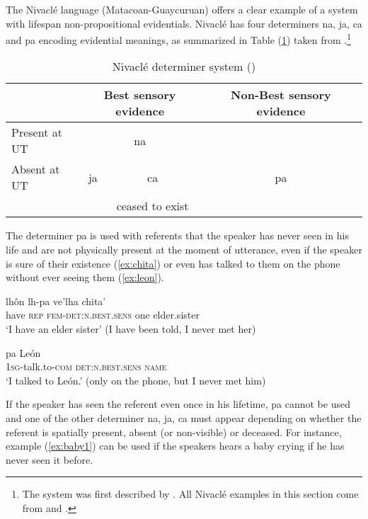 \documentclass[oneside,a4paper,11pt]{article}
\newcommand{\ipa}[1]{{\phon \mbox{#1}}} %
\begin{document}
  The Nivaclé language (Matacoan-Guaycuruan) offers a clear example of a system with lifespan non-propositional evidentials. Nivaclé has four determiners \ipa{na}, \ipa{ja}, \ipa{ca}  and \ipa{pa} encoding evidential meanings, as summarized in Table (\ref{tab:nivakle}) taken from \citet{gutierrez14determiners}.\footnote{The system was first described by \citet[363]{stell89niwakle}. All Nivaclé examples in this section come from \citet{gutierrez11evidentiality} and \citet{gutierrez14determiners}.}  
  
  
\begin{table}[H]
\caption{Nivaclé determiner system (\citealt{gutierrez14determiners}) } \centering \label{tab:nivakle}
\begin{tabular}{l|c|cc|cc}
\toprule
&\multicolumn{2}{c}{Best sensory evidence} &&Non-Best sensory evidence \\
\hline
Present at UT & \multicolumn{2}{c}{\ipa{na}}&& \\
\cline{1-4}
Absent at UT &\ipa{ja} & \ipa{ca}&&\ipa{pa}& \\
&&ceased to exist&\\
\bottomrule
\end{tabular}
\end{table}
   
  The determiner \ipa{pa} is used with referents that the speaker has never seen in his life and are not physically present at the moment of utterance, even if the speaker is sure of their existence (\ref{ex:chita}) or even has talked to them on the phone without ever seeing them (\ref{ex:leon}).
  
  \begin{exe}
\ex \label{ex:chita}
\gll   \ipa{caaj}  \ipa{lhôn}  \ipa{lh-pa}  \ipa{ve'lha}  \ipa{chita'} \\
have \textsc{rep} \textsc{fem-det:n.best.sens} one elder.sister \\
\glt `I have an elder sister' (I have been told, I never met her)
\end{exe}


\begin{exe}
\ex  \label{ex:leon}
\gll \ipa{ja-yasinôy-esh} \ipa{pa}  \ipa{León} \\
\textsc{1sg}-talk.to-\textsc{com} \textsc{det:n.best.sens} \textsc{name} \\
\glt  `I talked to León.' (only on the phone, but I never met him)
\end{exe}

If the speaker has seen the referent even once in his lifetime, \ipa{pa} cannot be used and one of the other determiner \ipa{na}, \ipa{ja}, \ipa{ca} must appear  depending on whether the referent is  spatially present, absent (or non-visible) or deceased. For instance, example (\ref{ex:baby1}) can be used if the speakers hears a baby crying if he has never seen it before.
\end{document}
